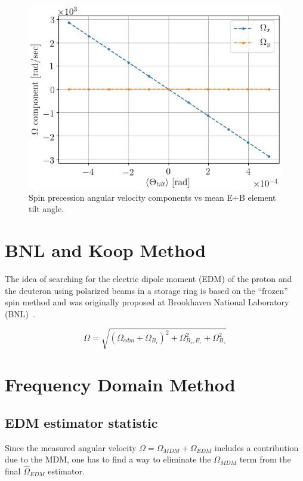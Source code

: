 \documentclass[a4paper]{jpconf}
\newcommand{\W}{\Omega}
\begin{document}
\begin{figure}[h]\centering
	\includegraphics[width=.6\linewidth]{Figures/linearity_test_shifting_gauss_freq}\hspace{3mm}%
	\begin{minipage}{.35\linewidth}\caption{Spin precession angular velocity components vs mean E+B element tilt angle.\label{fig:MDM_vs_tilt}}
	\end{minipage}
\end{figure}

\section{BNL and Koop Method}
The idea of searching for the electric dipole moment (EDM) of the proton and the deuteron using polarized beams in a storage ring is based on the ``frozen'' spin method and was originally proposed at Brookhaven National Laboratory (BNL)~\cite{Farley}.

\begin{equation}\label{eq:Omega}
\Omega=\sqrt{\left(\Omega_{edm}+\Omega_{B_r}\right)^{2}+\Omega_{B_v,E_r}^{2}+\Omega_{B_z}^{2}}	
\end{equation}

\section{Frequency Domain Method}
\subsection{EDM estimator statistic}
Since the measured angular velocity $\W = \W_{MDM} + \W_{EDM}$ includes a contribution due to the MDM, one has to find a way to eliminate the $\W_{MDM}$ term from the final $\hat\W_{EDM}$ estimator. 
\end{document}
